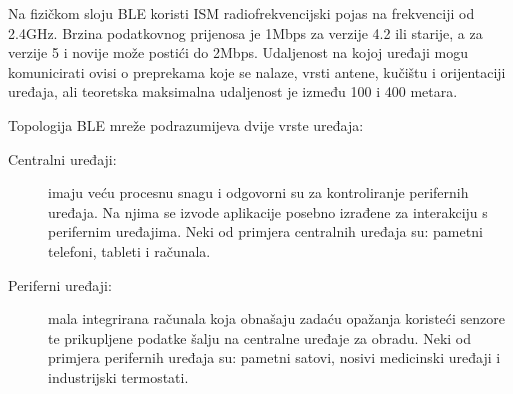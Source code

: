 \documentclass[times, utf8, diplomski]{fer}
\begin{document}
Na fizičkom sloju BLE koristi ISM  radiofrekvencijski pojas na frekvenciji od 2.4GHz. Brzina podatkovnog prijenosa je 1Mbps za verzije 4.2 ili starije, a za verzije 5 i novije može postići do 2Mbps. Udaljenost na kojoj uređaji mogu komunicirati ovisi o preprekama koje se nalaze, vrsti antene, kučištu i orijentaciji uređaja, ali teoretska maksimalna udaljenost je između 100 i 400 metara.

Topologija BLE mreže podrazumijeva dvije vrste uređaja:
\begin{description}
    \item[Centralni uređaji:]imaju veću procesnu snagu i odgovorni su za kontroliranje perifernih uređaja. Na njima se izvode aplikacije posebno izrađene za interakciju s perifernim uređajima. Neki od primjera centralnih uređaja su: pametni telefoni, tableti i računala. 
    \item[Periferni uređaji:]mala integrirana računala koja obnašaju zadaću opažanja koristeći senzore te prikupljene podatke šalju na centralne uređaje za obradu. Neki od primjera perifernih uređaja su: pametni satovi, nosivi medicinski uređaji i industrijski termostati.
\end{description}
\end{document}
